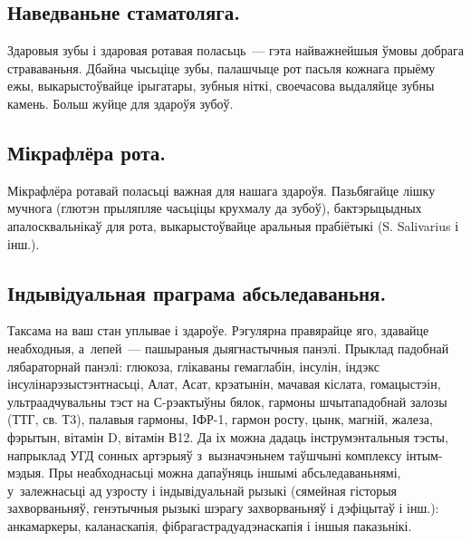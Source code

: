 
\subsection{Наведваньне стаматоляга.}
Здаровыя зубы і здаровая ротавая поласьць~--- гэта найважнейшыя ўмовы добрага страваваньня. Дбайна чысьціце зубы, палашчыце рот пасьля кожнага прыёму ежы, выкарыстоўвайце ірыгатары, зубныя ніткі, своечасова выдаляйце зубны камень. Больш жуйце для здароўя зубоў.

\subsection{Мікрафлёра рота.}
Мікрафлёра ротавай поласьці важная для нашага здароўя. Пазьбягайце лішку мучнога (глютэн прыляпляе часьціцы крухмалу да зубоў), бактэрыцыдных апалосквальнікаў для рота, выкарыстоўвайце аральныя прабіётыкі (S. Salivarius і інш.).

\subsection{Індывідуальная праграма абсьледаваньня.}
Таксама на ваш стан уплывае і здароўе. Рэгулярна правярайце яго, здавайце неабходныя, а~лепей~--- пашыраныя дыягнастычныя панэлі. Прыклад падобнай лябараторнай панэлі: глюкоза, глікаваны гемаглабін, інсулін, індэкс інсулінарэзыстэнтнасьці, Алат, Асат, крэатынін, мачавая кіслата, гомацыстэін, ультраадчувальны тэст на С-рэактыўны бялок, гармоны шчытападобнай залозы (ТТГ, св. Т3), палавыя гармоны, ІФР-1, гармон росту, цынк, магній, жалеза, фэрытын, вітамін D, вітамін В12. Да іх можна дадаць інструмэнтальныя тэсты, напрыклад УГД сонных артэрыяў з~вызначэньнем таўшчыні комплексу інтым-мэдыя. Пры неабходнасьці можна дапаўняць іншымі абсьледаваньнямі, у~залежнасьці ад узросту і індывідуальнай рызыкі (сямейная гісторыя захворваньняў, генэтычныя рызыкі шэрагу захворваньняў і дэфіцытаў і інш.): анкамаркеры, каланаскапія, фібрагастрадуадэнаскапія і іншыя паказьнікі.
